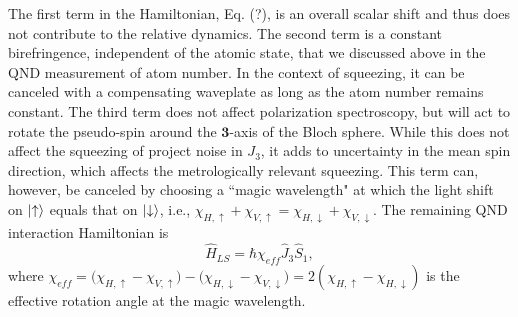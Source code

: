 \documentclass[preprint,aps,pra,onecolumn]{revtex4-1} %
\begin{document}
The first term in the Hamiltonian, Eq. (?), is an overall scalar shift and thus does not contribute to the relative dynamics.  The second term is a constant birefringence, independent of the atomic state, that we discussed above in the QND measurement of atom number.  In the context of squeezing, it can be canceled with a compensating waveplate as long as the atom number remains constant. The third term does not affect polarization spectroscopy, but will act to rotate the pseudo-spin around the $\mathbf{3}$-axis of the Bloch sphere.  While this does not affect the squeezing of project noise in $J_3$, it adds to uncertainty in the mean spin direction, which affects the metrologically relevant squeezing.   This term can, however, be canceled by choosing a ``magic wavelength" at which the light shift on $\lvert{\uparrow}\rangle$ equals that on $\lvert{\downarrow}\rangle$, i.e., 
$\chi_{H,\uparrow} +\chi_{V,\uparrow}  = \chi_{H,\downarrow} + \chi_{V,\downarrow}.$ The remaining QND interaction Hamiltonian is
\begin{equation}
\hat{H}_{LS} = \hbar \chi_{eff} \hat{J}_3 \hat{S}_1,
\end{equation}
where $\chi_{eff} = \big( \chi_{H, \uparrow} - \chi_{V,\uparrow} \big) - \big(\chi_{H,\downarrow} - \chi_{V,\downarrow} \big) = 2(\chi_{H, \uparrow}-\chi_{H, \downarrow})$ is the effective rotation angle at the magic wavelength.
\end{document}

